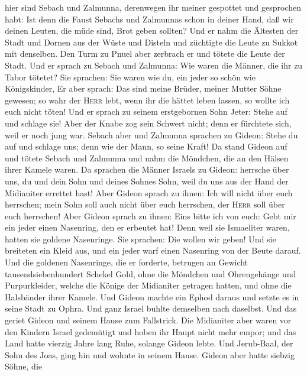hier sind Sebach und Zalmunna, derenwegen ihr meiner gespottet und
gesprochen habt: Ist denn die Faust Sebachs und Zalmunnas schon in
deiner Hand, daß wir deinen Leuten, die müde sind, Brot geben sollten?
 Und er nahm die Ältesten der Stadt und Dornen aus der
Wüste und Disteln und züchtigte die Leute zu Sukkot mit denselben.
 Den Turm zu Pnuel aber zerbrach er und tötete die Leute
der Stadt.  Und er sprach zu Sebach und Zalmunna: Wie
waren die Männer, die ihr zu Tabor tötetet? Sie sprachen: Sie waren wie
du, ein jeder so schön wie Königskinder,  Er aber sprach:
Das sind meine Brüder, meiner Mutter Söhne gewesen; so wahr der
\textsc{Herr} lebt, wenn ihr die hättet leben lassen, so wollte ich euch
nicht töten!  Und er sprach zu seinem erstgebornen Sohn
Jeter: Stehe auf und schlage sie! Aber der Knabe zog sein Schwert nicht;
denn er fürchtete sich, weil er noch jung war.  Sebach
aber und Zalmunna sprachen zu Gideon: Stehe du auf und schlage uns; denn
wie der Mann, so seine Kraft! Da stand Gideon auf und tötete Sebach und
Zalmunna und nahm die Möndchen, die an den Hälsen ihrer Kamele waren.
 Da sprachen die Männer Israels zu Gideon: herrsche über
uns, du und dein Sohn und deines Sohnes Sohn, weil du uns aus der Hand
der Midianiter errettet hast!  Aber Gideon sprach zu
ihnen: Ich will nicht über euch herrschen; mein Sohn soll auch nicht
über euch herrschen, der \textsc{Herr} soll über euch herrschen!
 Aber Gideon sprach zu ihnen: Eins bitte ich von euch:
Gebt mir ein jeder einen Nasenring, den er erbeutet hat! Denn weil sie
Ismaeliter waren, hatten sie goldene Nasenringe.  Sie
sprachen: Die wollen wir geben! Und sie breiteten ein Kleid aus, und ein
jeder warf einen Nasenring von der Beute darauf.  Und die
goldenen Nasenringe, die er forderte, betrugen an Gewicht
tausendsiebenhundert Schekel Gold, ohne die Möndchen und Ohrengehänge
und Purpurkleider, welche die Könige der Midianiter getragen hatten, und
ohne die Halsbänder ihrer Kamele.  Und Gideon machte ein
Ephod daraus und setzte es in seine Stadt zu Ophra. Und ganz Israel
buhlte demselben nach daselbst. Und das geriet Gideon und seinem Hause
zum Fallstrick.  Die Midianiter aber waren vor den
Kindern Israel gedemütigt und hoben ihr Haupt nicht mehr empor; und das
Land hatte vierzig Jahre lang Ruhe, solange Gideon lebte.
 Und Jerub-Baal, der Sohn des Joas, ging hin und wohnte
in seinem Hause.  Gideon aber hatte siebzig Söhne, die
